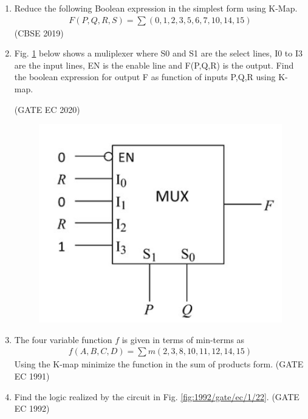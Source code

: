 \begin{enumerate}
\item 
	Reduce the following Boolean expression in the simplest form using K-Map.
		\begin{align}
F(P,Q,R,S) = \sum (0,1,2,3,5,6,7,10,14,15)
		\end{align}
\hfill (CBSE 2019)
\label{prob:2019/c/6/d}
%
\item Fig. \ref{fig:2020/gate/ec/10} below shows a muliplexer where S0 and S1 are the select lines, I0 to I3 are the input lines, EN is the enable line and F(P,Q,R) is the output. Find the boolean expression for output F as function of inputs P,Q,R using K-map. 

\label{prob:2020/gate/ec/10}
\hfill (GATE EC 2020)
\begin{figure}[ht]
\centering
	\includegraphics[width=1\columnwidth]{figs/2020-gate-ec-10.png}
\caption{}
\label{fig:2020/gate/ec/10}
\end{figure}
%
\item
	The four variable function $f$ is given in terms of min-terms as
		\begin{align}
	    f(A,B,C,D) = \sum m(2,3,8,10,11,12,14,15)
\label{eq:1991/gate/ec/9}
		\end{align}
	    Using the K-map minimize the function in the sum of products form. 
\label{prob:1991/gate/ec/9}
\hfill (GATE EC 1991)
\item Find the logic realized by the circuit in Fig. 
\ref{fig:1992/gate/ec/1/22}.
\label{prob:1992/gate/ec/1/22}
\hfill (GATE EC 1992)
\begin{figure}[ht]

\end{figure}
\end{enumerate}
